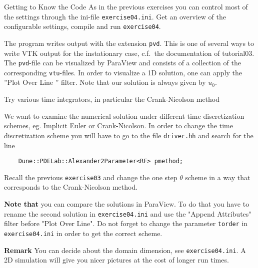 \documentclass[12pt,a4paper]{article}
\begin{document}
\begin{Exercise}{Getting to Know the Code}
  As in the previous exercises you can control most of the settings
  through the ini-file \lstinline!exercise04.ini!. Get an overview of
  the configurable settings, compile and run \lstinline!exercise04!.

  The program writes output with the extension \lstinline!pvd!. This is one
  of several ways to write VTK output for the instationary case,
  c.f.~the documentation of tutorial03. The \lstinline!pvd!-file can
  be visualized by ParaView and consists of a collection of the
  corresponding \lstinline!vtu!-files. In order to visualize a 1D solution, one can apply the ''Plot Over Line '' filter. Note that our solution is always given by $u_0$.

\end{Exercise}

\begin{Exercise}{ Try various time integrators, in particular the Crank-Nicolson method}

  We want to examine the numerical solution under different time
  discretization schemes, eg. Implicit Euler or Crank-Nicolson. In order to change the time discretization   scheme you will have to go to the file \lstinline!driver.hh! and
  search for the line
  \begin{lstlisting}
    Dune::PDELab::Alexander2Parameter<RF> pmethod;
  \end{lstlisting}

 Recall the previous \lstinline!exercise03! and change the one
 step $\theta$ scheme in a way that corresponds to the Crank-Nicolson method.

  \textbf{Note that} you can compare the solutions in ParaView. To do that you have to rename the second solution in \lstinline!exercise04.ini! and use the "Append Attributes" filter before "Plot Over Line". Do not forget to change the parameter \lstinline!torder! in \lstinline!exercise04.ini! in order to get the correct scheme.


\end{Exercise}


 \textbf{Remark} You can decide about the domain dimension, see \lstinline!exercise04.ini!. A 2D simulation will give you nicer pictures at the cost of longer run times.
\end{document}

